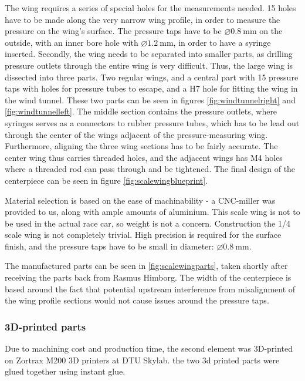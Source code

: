       The wing requires a series of special holes for the measurements needed. 15 holes have to be made along the very narrow wing profile, in order to measure the pressure on the wing's surface. The pressure taps have to be $\diameter\SI{0.8}{\milli\metre}$ on the outside, with an inner bore hole with $\diameter\SI{1.2}{\milli\metre}$, in order to have a syringe inserted. Secondly, the wing needs to be separated into smaller parts, as drilling pressure outlets through the entire wing is very difficult. Thus, the large wing is dissected into three parts. Two regular wings, and a central part with 15 pressure taps with holes for pressure tubes to escape, and a H7 hole for fitting the wing in the wind tunnel. These two parts can be seen in figures \ref{fig:windtunnelright} and \ref{fig:windtunnelleft}. The middle section contains the pressure outlets, where syringes serves as a connectors to rubber pressure tubes, which has to be lead out through the center of the wings adjacent of the pressure-measuring wing. Furthermore, aligning the three wing sections has to be fairly accurate. The center wing thus carries threaded holes, and the adjacent wings has M4 holes where a threaded rod can pass through and be tightened. The final design of the centerpiece can be seen in figure \ref{fig:scalewingblueprint}.

      Material selection is based on the ease of machinability - a CNC-miller was provided to us, along with ample amounts of aluminium. This scale wing is not to be used in the actual race car, so weight is not a concern. Construction the 1/4 scale wing is not completely trivial. High precision is required for the surface finish, and the pressure taps have to be small in diameter: $\diameter\SI{0.8}{\milli\metre}$.

      The manufactured parts can be seen in \ref{fig:scalewingparts}, taken shortly after receiving the parts back from Rasmus Himborg. The width of the centerpiece is based around the fact that potential upstream interference from misalignment of the wing profile sections would not cause issues around the pressure taps.

      \subsubsection{3D-printed parts}

        Due to machining cost and production time, the second element was 3D-printed on Zortrax M200 3D printers at DTU Skylab. the two 3d printed parts were glued together using instant glue.

